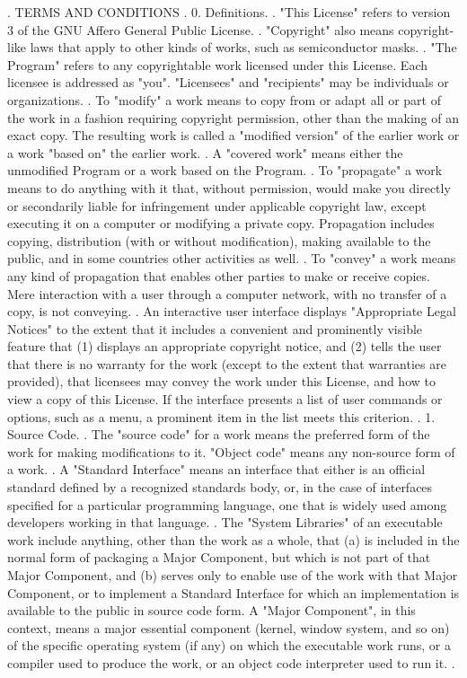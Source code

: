\begin{script}
 .
                        TERMS AND CONDITIONS
 .
   0. Definitions.
 .
   "This License" refers to version 3 of the GNU Affero General Public License.
 .
   "Copyright" also means copyright-like laws that apply to other kinds of
  works, such as semiconductor masks.
 .
  "The Program" refers to any copyrightable work licensed under this
 License.  Each licensee is addressed as "you".  "Licensees" and
 "recipients" may be individuals or organizations.
 .
   To "modify" a work means to copy from or adapt all or part of the work
 in a fashion requiring copyright permission, other than the making of an
 exact copy.  The resulting work is called a "modified version" of the
 earlier work or a work "based on" the earlier work.
 .
   A "covered work" means either the unmodified Program or a work based
 on the Program.
 .
   To "propagate" a work means to do anything with it that, without
 permission, would make you directly or secondarily liable for
 infringement under applicable copyright law, except executing it on a
 computer or modifying a private copy.  Propagation includes copying,
 distribution (with or without modification), making available to the
 public, and in some countries other activities as well.
 .
   To "convey" a work means any kind of propagation that enables other
 parties to make or receive copies.  Mere interaction with a user through
 a computer network, with no transfer of a copy, is not conveying.
 .
   An interactive user interface displays "Appropriate Legal Notices"
 to the extent that it includes a convenient and prominently visible
 feature that (1) displays an appropriate copyright notice, and (2)
 tells the user that there is no warranty for the work (except to the
 extent that warranties are provided), that licensees may convey the
 work under this License, and how to view a copy of this License.  If
 the interface presents a list of user commands or options, such as a
 menu, a prominent item in the list meets this criterion.
 .
   1. Source Code.
 .
   The "source code" for a work means the preferred form of the work
 for making modifications to it.  "Object code" means any non-source
 form of a work.
 .
   A "Standard Interface" means an interface that either is an official
 standard defined by a recognized standards body, or, in the case of
 interfaces specified for a particular programming language, one that
 is widely used among developers working in that language.
 .
   The "System Libraries" of an executable work include anything, other
 than the work as a whole, that (a) is included in the normal form of
 packaging a Major Component, but which is not part of that Major
 Component, and (b) serves only to enable use of the work with that
 Major Component, or to implement a Standard Interface for which an
 implementation is available to the public in source code form.  A
 "Major Component", in this context, means a major essential component
 (kernel, window system, and so on) of the specific operating system
 (if any) on which the executable work runs, or a compiler used to
 produce the work, or an object code interpreter used to run it.
 .
\end{script}

